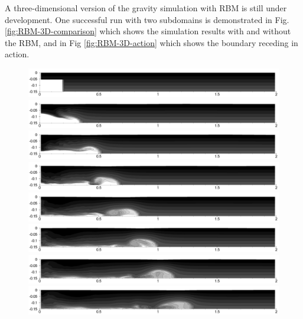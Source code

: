 A three-dimensional version of the gravity simulation with RBM is still under development. One successful run with two subdomains is demonstrated in Fig. \ref{fig:RBM-3D-comparison} which shows the simulation results with and without the RBM, and in Fig \ref{fig:RBM-3D-action} which shows the boundary receding in action.



 \begin{figure}[htbp]
  \begin{center}
\includegraphics[scale=0.35]{../figures/Exp3-CASE1-dt0.005/OneDomain/01.pdf} \includegraphics[scale=0.35]{../figures/Exp3-CASE1-dt0.005/OneDomain/03.pdf}
\includegraphics[scale=0.35]{../figures/Exp3-CASE1-dt0.005/OneDomain/05.pdf}
\includegraphics[scale=0.35]{../figures/Exp3-CASE1-dt0.005/OneDomain/07.pdf}
\includegraphics[scale=0.35]{../figures/Exp3-CASE1-dt0.005/OneDomain/09.pdf}
\includegraphics[scale=0.35]{../figures/Exp3-CASE1-dt0.005/OneDomain/11.pdf}
\includegraphics[scale=0.35]{../figures/Exp3-CASE1-dt0.005/OneDomain/13.pdf}
\includegraphics[scale=0.35]{../figures/Exp3-CASE1-dt0.005/OneDomain/15.pdf}

\end{center}
\end{figure}
